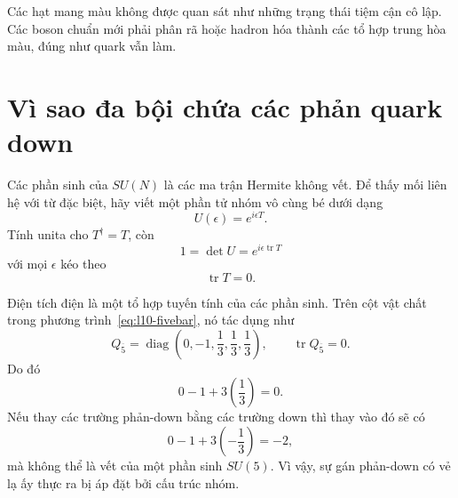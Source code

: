 \begin{classroomqa}
\end{classroomqa}

Các hạt mang màu không được quan sát như những trạng thái tiệm cận cô lập. Các boson chuẩn mới phải phân rã hoặc hadron hóa thành các tổ hợp trung hòa màu, đúng như quark vẫn làm.

\section{Vì sao đa bội chứa các phản quark down}

Các phần sinh của \(SU(N)\) là các ma trận Hermite không vết. Để thấy mối liên hệ với từ đặc biệt, hãy viết một phần tử nhóm vô cùng bé dưới dạng
\begin{equation}
U(\epsilon)=e^{i\epsilon T}.
\end{equation}
Tính unita cho \(T^\dagger=T\), còn
\begin{equation}
1=\det U=e^{i\epsilon\operatorname{tr}T}
\end{equation}
với mọi \(\epsilon\) kéo theo
\begin{equation}
\operatorname{tr}T=0.
\label{eq:l10-traceless-generator}
\end{equation}

Điện tích điện là một tổ hợp tuyến tính của các phần sinh. Trên cột vật chất trong phương trình~\eqref{eq:l10-fivebar}, nó tác dụng như
\begin{equation}
Q_{\overline5}
=
\operatorname{diag}
\left(0,-1,\frac13,\frac13,\frac13\right),
\qquad
\operatorname{tr}Q_{\overline5}=0.
\label{eq:l10-charge-fivebar}
\end{equation}
Do đó
\begin{equation}
0-1+3\left(\frac13\right)=0.
\end{equation}
Nếu thay các trường phản-down bằng các trường down thì thay vào đó sẽ có
\begin{equation}
0-1+3\left(-\frac13\right)=-2,
\end{equation}
mà không thể là vết của một phần sinh \(SU(5)\). Vì vậy, sự gán phản-down có vẻ lạ ấy thực ra bị áp đặt bởi cấu trúc nhóm.

